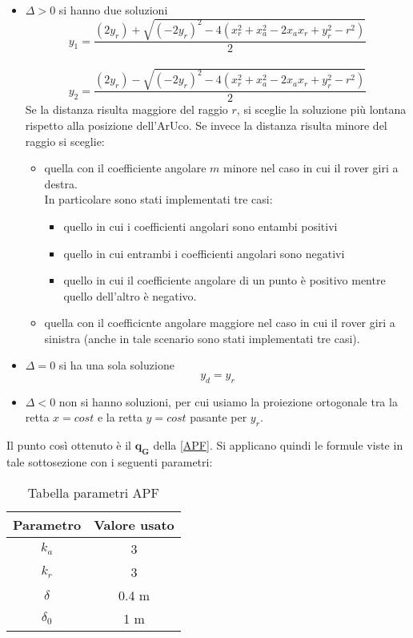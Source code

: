 \begin{itemize}
    \item $\Delta>0$ si hanno due soluzioni
        \begin{equation}
        y_1=\frac{(2y_r)+\sqrt{(-2y_r)^2-4(x_r^2+x_a^2-2x_ax_r+y_r^2-r^2)}}{2}
        \end{equation}
        \\
        \begin{equation}
        y_2=\frac{(2y_r)-\sqrt{(-2y_r)^2-4(x_r^2+x_a^2-2x_ax_r+y_r^2-r^2)}}{2}
        \end{equation}
 Se la distanza risulta maggiore del raggio $r$, si sceglie la soluzione più lontana rispetto alla posizione dell'ArUco.
        Se invece la distanza risulta minore del raggio si sceglie: 
        \begin{itemize}
            \item quella con il coefficiente angolare $m$ minore nel caso in cui il rover giri a destra. \\In particolare sono stati implementati tre casi:
            \begin{itemize}
            \item quello in cui i coefficienti angolari sono entambi positivi
            \item quello in cui entrambi i coefficienti angolari sono negativi
            \item quello in cui il coefficiente angolare di un punto è positivo mentre quello dell'altro è negativo.
            \end{itemize}
            \item quella con il coefficicnte angolare maggiore nel caso in cui il rover giri a sinistra (anche in tale scenario sono stati implementati tre casi).
        \end{itemize}
    \item $\Delta=0$ si ha una sola soluzione
    \begin{equation}
        y_d=y_r
        \end{equation}
    \item $\Delta<0$ non si hanno soluzioni, per cui usiamo la proiezione ortogonale tra la retta $x=cost$ e la retta $y=cost$ pasante per $y_r$.
\end{itemize}
Il punto così ottenuto è il $\boldsymbol{q_G}$ della \autoref{APF}.
Si applicano quindi le formule viste in tale sottosezione con i seguenti parametri: 
\begin{table} [H]
    \centering
    \begin{tabular}{|cc|}
    \hline
        Parametro & Valore usato \\  \hline
        $k_a$ &   3   \\  \hline
        $k_r$ &   3\\  \hline
        $\delta$ & 0.4  m \\  \hline
        $\delta_0$ &  1  m\\  \hline
    \end{tabular}
    \caption{Tabella parametri APF}
    \label{tab:APF} 
\end{table}

